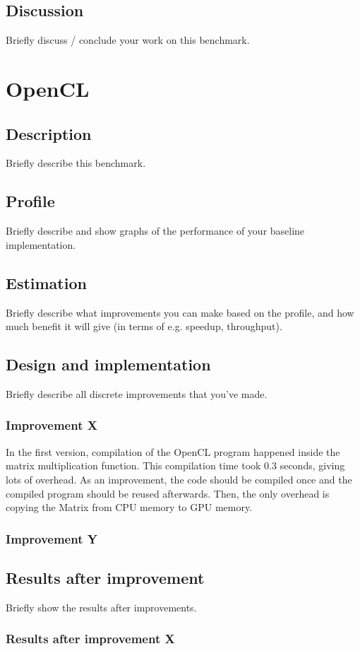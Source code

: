 \documentclass[twocolumn]{article}
\begin{document}
\subsection{Discussion}
Briefly discuss / conclude your work on this benchmark.

\section{OpenCL}
\subsection{Description}
Briefly describe this benchmark.
\subsection{Profile}
Briefly describe and show graphs of the performance of your baseline implementation.
\subsection{Estimation}
Briefly describe what improvements you can make based on the profile, and how much benefit it will give (in terms of e.g. speedup, throughput).
\subsection{Design and implementation}
Briefly describe all discrete improvements that you've made.
\subsubsection{Improvement X}
In the first version, compilation of the OpenCL program happened inside the matrix multiplication function. This compilation time took 0.3 seconds, giving lots of overhead. As an improvement, the code should be compiled once and the compiled program should be reused afterwards. Then, the only overhead is copying the Matrix from CPU memory to GPU memory.
\subsubsection{Improvement Y}
\subsection{Results after improvement}
Briefly show the results after improvements.
\subsubsection{Results after improvement X}
\end{document}

